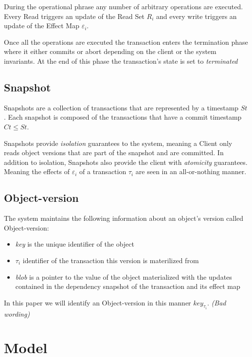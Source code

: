 \documentclass[systeme]{compas2022}
\begin{document}
During the operational phrase any number of arbitrary operations are executed.
Every Read triggers an update of the Read Set $R_i$ and every write triggers an update of the Effect Map $\varepsilon_i$.

Once all the operations are executed the transaction enters the termination phase where it either commits or abort depending on the client or the system invariants. 
At the end of this phase the transaction's state is set to \emph{terminated}

\subsection{Snapshot}

Snapshots are a collection of transactions that are represented by a timestamp $St$.
Each snapshot is composed of the transactions that have a commit timestamp $Ct \leq St$. 

Snapshots provide \emph{isolation} guarantees to the system, meaning a Client only reads object versions that are part of the snapshot and are committed. 
In addition to isolation, Snapshots also provide the client with \emph{atomicity} guarantees.
Meaning the effects of $\varepsilon_i$ of a transaction $\tau_i$ are seen in an all-or-nothing manner.

\subsection{Object-version}

The system maintains the following information about an object's version called Object-version: 
\begin{itemize}
  \item \emph{key} is the unique identifier of the object
  \item \emph{$\tau_i$} identifier of the transaction this version is materilized from
  \item \emph{blob} is a pointer to the value of the object materialized with the updates contained in the dependency snapshot of the transaction and its effect map
\end{itemize}

In this paper we will identify an Object-version in this manner $key_{\tau_i}$. \emph{(Bad wording)}

\section{Model}
\end{document}
